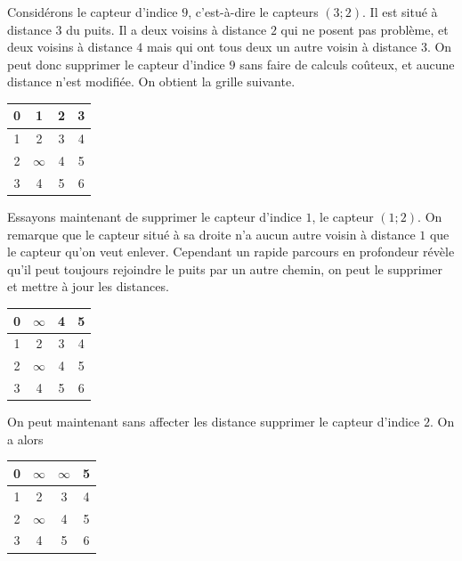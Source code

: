 \documentclass[12pt,a4paper]{article}
\begin{document}
Considérons le capteur d'indice $9$, c'est-à-dire le capteurs $(3;2)$. Il est situé à distance $3$ du puits. Il a deux voisins à distance $2$ qui ne posent pas problème, et deux voisins à distance $4$ mais qui ont tous deux un autre voisin à distance $3$. On peut donc supprimer le capteur d'indice $9$ sans faire de calculs coûteux, et aucune distance n'est modifiée. On obtient la grille suivante.

\begin{center}
\begin{tabular}{|c|c|c|c|}
\hline 
0 & 1 & 2 & 3 \\ 
\hline 
1 & 2 & 3 & 4 \\ 
\hline 
2 & $\infty$ & 4 & 5 \\ 
\hline 
3 & 4 & 5 & 6 \\ 
\hline 
\end{tabular} 

\end{center}
Essayons maintenant de supprimer le capteur d'indice $1$, le capteur $(1;2)$. On remarque que le capteur situé à sa droite n'a aucun autre voisin à distance $1$ que le capteur qu'on veut enlever. Cependant un rapide parcours en profondeur révèle qu'il peut toujours rejoindre le puits par un autre chemin, on peut le supprimer et mettre à jour les distances.

\begin{center}
\begin{tabular}{|c|c|c|c|}
\hline 
0 & $\infty$ & 4 & 5 \\ 
\hline 
1 & 2 & 3 & 4 \\ 
\hline 
2 & $\infty$ & 4 & 5 \\ 
\hline 
3 & 4 & 5 & 6 \\ 
\hline 

\end{tabular} 
\end{center}

On peut maintenant sans affecter les distance supprimer le capteur d'indice $2$. On a alors

\begin{center}
\begin{tabular}{|c|c|c|c|}
\hline 
0 & $\infty$ & $\infty$ & 5 \\ 
\hline 
1 & 2 & 3 & 4 \\ 
\hline 
2 & $\infty$ & 4 & 5 \\ 
\hline 
3 & 4 & 5 & 6 \\ 
\hline 

\end{tabular} 
\end{center}
\end{document}
